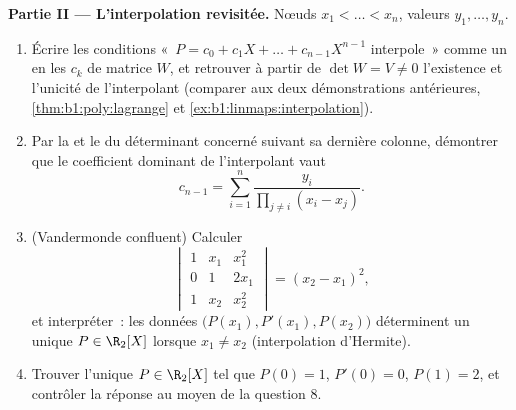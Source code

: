 \begin{problem}
\medskip
\noindent\textbf{Partie II --- L'interpolation revisitée.} Nœuds
$x_1 < \dots < x_n$, valeurs $y_1, \dots, y_n$.
\begin{enumerate}[resume]
  \item Écrire les conditions «~$P = c_0 + c_1X + \dots +
        c_{n-1}X^{n-1}$ interpole~» comme un  en les
        $c_k$ de matrice $W$, et retrouver à partir de $\det W = V \neq
        0$ l'existence et l'unicité de l'interpolant
        (comparer aux deux démonstrations antérieures,
        \cref{thm:b1:poly:lagrange} et
        \cref{ex:b1:linmaps:interpolation}).
  \item Par la  et le 
        du déterminant concerné suivant sa dernière colonne, démontrer
        que le coefficient dominant de l'interpolant vaut
        \[
        c_{n-1} = \sum_{i=1}^{n}
        \frac{y_i}{\prod_{j \neq i}(x_i - x_j)} .
        \]
  \item (Vandermonde confluent) Calculer
        \[
        \begin{vmatrix}
        1 & x_1 & x_1^2\\
        0 & 1 & 2x_1\\
        1 & x_2 & x_2^2
        \end{vmatrix}
        = (x_2 - x_1)^2 ,
        \]
        et interpréter~: les données $\bigl(P(x_1), P'(x_1),
        P(x_2)\bigr)$ déterminent un unique $P \in \R_2[X]$ lorsque
        $x_1 \neq x_2$ (interpolation d'Hermite).
  \item Trouver l'unique $P \in \R_2[X]$ tel que $P(0) = 1$, $P'(0)
        = 0$, $P(1) = 2$, et contrôler la réponse au moyen de la
        question 8.
\end{enumerate}


\end{problem}
